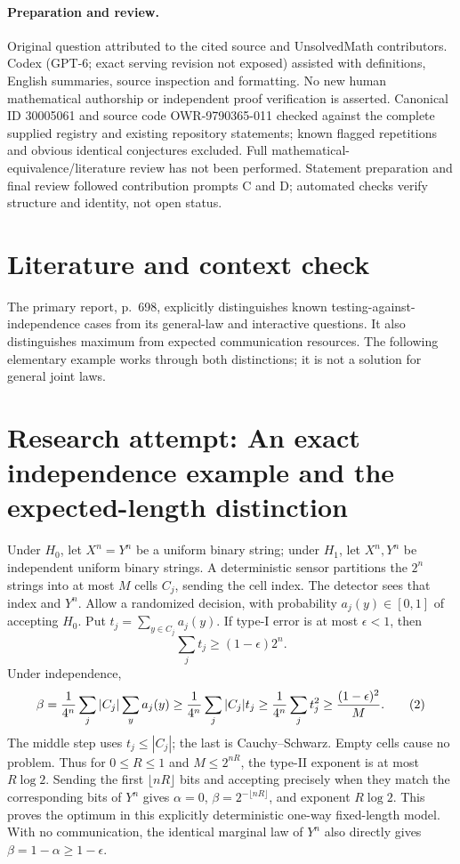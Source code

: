 \documentclass[11pt]{article}
\begin{document}
\paragraph{Preparation and review.}
Original question attributed to the cited source and UnsolvedMath contributors. Codex (GPT-6; exact serving revision not exposed) assisted with definitions, English summaries, source inspection and formatting. No new human mathematical authorship or independent proof verification is asserted. Canonical ID 30005061 and source code OWR-9790365-011 checked against the complete supplied registry and existing repository statements; known flagged repetitions and obvious identical conjectures excluded. Full mathematical-equivalence/literature review has not been performed. Statement preparation and final review followed contribution prompts C and D; automated checks verify structure and identity, not open status.
\label{end:30005061}

\section{Literature and context check}
The primary report, p.~698, explicitly distinguishes known testing-against-independence cases from its general-law and interactive questions. It also distinguishes maximum from expected communication resources. The following elementary example works through both distinctions; it is not a solution for general joint laws.
\section{Research attempt: An exact independence example and the expected-length distinction}
Under $H_0$, let $X^n=Y^n$ be a uniform binary string; under $H_1$, let $X^n,Y^n$ be independent uniform binary strings. A deterministic sensor partitions the $2^n$ strings into at most $M$ cells $C_j$, sending the cell index. The detector sees that index and $Y^n$. Allow a randomized decision, with probability $a_j(y)\in[0,1]$ of accepting $H_0$. Put $t_j=\sum_{y\in C_j}a_j(y)$. If type-I error is at most $\epsilon<1$, then
\[
 \sum_jt_j\geq(1-\epsilon)2^n.
\]
Under independence,
\[
 \beta={1\over4^n}\sum_j |C_j|\sum_y a_j(y)
 \geq {1\over4^n}\sum_j |C_j|t_j
 \geq {1\over4^n}\sum_jt_j^2
 \geq{(1-\epsilon)^2\over M}.                 \tag{2}
\]
The middle step uses $t_j\leq|C_j|$; the last is Cauchy--Schwarz. Empty cells cause no problem. Thus for $0\leq R\leq1$ and $M\leq2^{nR}$, the type-II exponent is at most $R\log2$. Sending the first $\lfloor nR\rfloor$ bits and accepting precisely when they match the corresponding bits of $Y^n$ gives $\alpha=0$, $\beta=2^{-\lfloor nR\rfloor}$, and exponent $R\log2$. This proves the optimum in this explicitly deterministic one-way fixed-length model. With no communication, the identical marginal law of $Y^n$ also directly gives $\beta=1-\alpha\geq1-\epsilon$.
\end{document}
